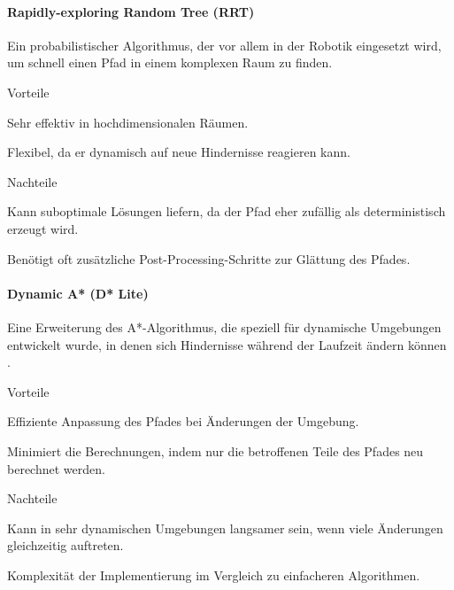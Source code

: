 \documentclass[../main.tex]{subfiles}
\begin{document}
\paragraph{Rapidly-exploring Random Tree (RRT)}

Ein probabilistischer Algorithmus, der vor allem in der Robotik eingesetzt wird,
um schnell einen Pfad in einem komplexen Raum zu finden.

\begin{minipage}[t]{0.48\textwidth}
\begin{items}
  \item [Vorteile]
  \item Sehr effektiv in hochdimensionalen Räumen.
  \item Flexibel, da er dynamisch auf neue Hindernisse reagieren kann.
\end{items}
\end{minipage}
\hfill
\begin{minipage}[t]{0.48\textwidth}
\begin{items}
  \item [Nachteile]
  \item Kann suboptimale Lösungen liefern, da der Pfad eher zufällig als deterministisch erzeugt wird.
  \item Benötigt oft zusätzliche Post-Processing-Schritte zur Glättung des Pfades.
\end{items}
\end{minipage}

\paragraph{Dynamic A* (D* Lite)}

Eine Erweiterung des A*-Algorithmus, die speziell für dynamische Umgebungen entwickelt wurde, in denen sich Hindernisse während der Laufzeit ändern können \cite{d_star}.

\begin{minipage}[t]{0.48\textwidth}
\begin{items}
  \item [Vorteile]
  \item Effiziente Anpassung des Pfades bei Änderungen der Umgebung.
  \item Minimiert die Berechnungen, indem nur die betroffenen Teile des Pfades neu berechnet werden.
\end{items}
\end{minipage}
\hfill
\begin{minipage}[t]{0.48\textwidth}
\begin{items}
  \item [Nachteile]
  \item Kann in sehr dynamischen Umgebungen langsamer sein, wenn viele Änderungen gleichzeitig auftreten.
  \item Komplexität der Implementierung im Vergleich zu einfacheren Algorithmen.
\end{items}
\end{minipage}
\end{document}
